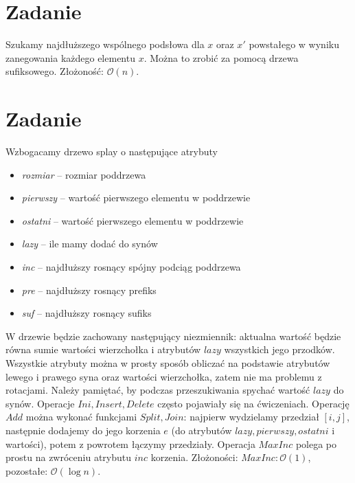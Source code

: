 \documentclass[12pt, a4paper]{article}
\newcommand{\MCALO}{\mathcal{O}}
\newcounter{zadanie}
\newcommand{\zadanie}{\addtocounter{zadanie}{1}\section*{Zadanie \arabic{zadanie}}}
\begin{document}
\zadanie{}
Szukamy najdłuższego wspólnego podsłowa dla $x$ oraz $x'$ powstałego w wyniku
zanegowania każdego elementu $x$. Można to zrobić za pomocą drzewa sufiksowego.
Złożoność: $\MCALO(n)$.

\zadanie{}
Wzbogacamy drzewo splay o następujące atrybuty
\begin{itemize}
  \item \textit{rozmiar} -- rozmiar poddrzewa
  \item \textit{pierwszy} -- wartość pierwszego elementu w poddrzewie
  \item \textit{ostatni} -- wartość pierwszego elementu w poddrzewie
  \item \textit{lazy} -- ile mamy dodać do synów
  \item \textit{inc} -- najdłuższy rosnący spójny podciąg poddrzewa
  \item \textit{pre} -- najdłuższy rosnący prefiks
  \item \textit{suf} -- najdłuższy rosnący sufiks
\end{itemize}
W drzewie będzie zachowany następujący niezmiennik: aktualna wartość będzie
równa sumie wartości wierzchołka i atrybutów $\mathit{lazy}$ wszystkich jego
przodków. Wszystkie atrybuty można w prosty sposób obliczać na podstawie
atrybutów lewego i prawego syna oraz wartości wierzchołka, zatem nie ma
problemu z rotacjami. Należy pamiętać, by podczas przeszukiwania spychać
wartość $lazy$ do synów. Operacje $\mathit{Ini, Insert, Delete}$ często
pojawiały się na ćwiczeniach. Operację $\mathit{Add}$ można wykonać funkcjami
$\mathit{Split, Join}$: najpierw wydzielamy przedział $[i,j]$, następnie
dodajemy do jego korzenia $e$ (do atrybutów $\mathit{lazy,pierwszy,ostatni}$
i wartości), potem z powrotem łączymy przedziały. Operacja $\mathit{MaxInc}$
polega po prostu na zwróceniu atrybutu $\mathit{inc}$ korzenia. Złożoności:
$\mathit{MaxInc}: \MCALO(1)$, pozostałe: $\MCALO(\log{n})$.
\end{document}
